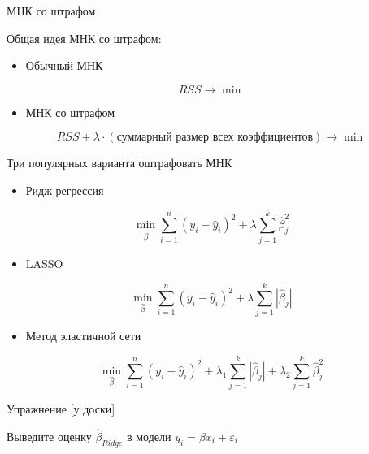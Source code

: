 \documentclass[russian,ignorenonframetext,]{beamer}
\providecommand{\tightlist}{%
  \setlength{\itemsep}{0pt}\setlength{\parskip}{0pt}}
\begin{document}
\begin{frame}{МНК со штрафом}

Общая идея МНК со штрафом:

\begin{itemize}
\tightlist
\item
  Обычный МНК
\end{itemize}

\[
RSS \to \min
\]

\begin{itemize}
\tightlist
\item
  МНК со штрафом
\end{itemize}

\[
RSS + \lambda \cdot (\text{суммарный размер всех коэффициентов}) \to \min
\]

\end{frame}

\begin{frame}{Три популярных варианта оштрафовать МНК}

\begin{itemize}
\tightlist
\item
  Ридж-регрессия
\end{itemize}

\[
\min_{\hat{\beta}} \sum_{i=1}^n (y_i-\hat{y}_i)^2 + \lambda \sum_{j=1}^k \hat{\beta}_j^2
\]

\begin{itemize}
\tightlist
\item
  LASSO
\end{itemize}

\[
\min_{\hat{\beta}} \sum_{i=1}^n (y_i-\hat{y}_i)^2 + \lambda \sum_{j=1}^k |\hat{\beta}_j|
\]

\begin{itemize}
\tightlist
\item
  Метод эластичной сети
\end{itemize}

\[
\min_{\hat{\beta}} \sum_{i=1}^n (y_i-\hat{y}_i)^2 + \lambda_1 \sum_{j=1}^k |\hat{\beta}_j| + \lambda_2 \sum_{j=1}^k \hat{\beta}_j^2
\]

\end{frame}

\begin{frame}{Упражнение {[}у доски{]}}

Выведите оценку \(\hat{\beta}_{Ridge}\) в модели
\(y_i=\beta x_i + \varepsilon_i\)

\end{frame}
\end{document}
